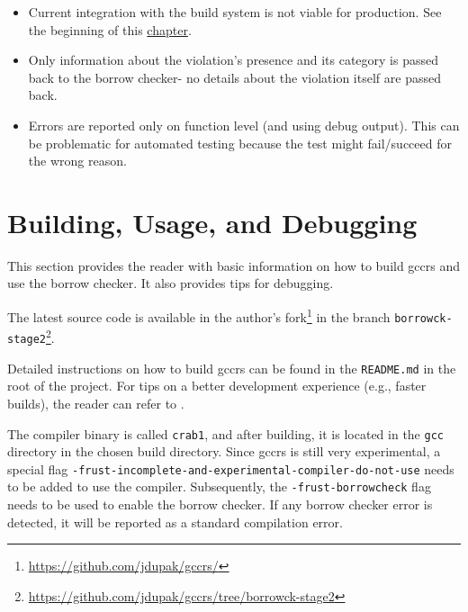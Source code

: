 \documentclass[
  11pt,
  twoside,symmetric]{report}
\newenvironment{Shaded}{}{}
\newcommand{\NormalTok}[1]{#1}
\providecommand{\tightlist}{%
  \setlength{\itemsep}{0pt}\setlength{\parskip}{0pt}}
\DeclareRobustCommand{\href}[2]{#2\footnote{\url{#1}}}
\begin{document}
\begin{itemize}
\tightlist
\item
  Current integration with the build system is not viable for
  production. See the beginning of this
  \hyperref[implementation]{chapter}.
\item
  Only information about the violation's presence and its category is
  passed back to the borrow checker- no details about the violation
  itself are passed back.
\item
  Errors are reported only on function level (and using debug output).
  This can be problematic for automated testing because the test might
  fail/succeed for the wrong reason.
\end{itemize}

\section{Building, Usage, and
Debugging}\label{building-usage-and-debugging}

This section provides the reader with basic information on how to build
gccrs and use the borrow checker. It also provides tips for debugging.

The latest source code is available in the author's
\href{https://github.com/jdupak/gccrs/}{fork} in the branch
\href{https://github.com/jdupak/gccrs/tree/borrowck-stage2}{\texttt{borrowck-stage2}}.

Detailed instructions on how to build gccrs can be found in the
\texttt{README.md} in the root of the project. For tips on a better
development experience (e.g., faster builds), the reader can refer to
.

The compiler binary is called \texttt{crab1}, and after building, it is
located in the \texttt{gcc} directory in the chosen build directory.
Since gccrs is still very experimental, a special flag
\texttt{-frust-incomplete-and-experimental-compiler-do-not-use} needs to
be added to use the compiler. Subsequently, the
\texttt{-frust-borrowcheck} flag needs to be used to enable the borrow
checker. If any borrow checker error is detected, it will be reported as
a standard compilation error.

\begin{quote}
\begin{Shaded}
\end{Shaded}
\end{quote}
\end{document}
